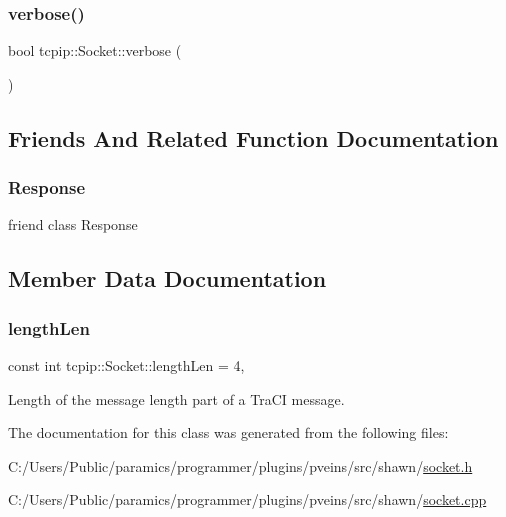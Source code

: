 \subsubsection{\texorpdfstring{verbose()}{verbose()}}
{\footnotesize\ttfamily bool tcpip\+::\+Socket\+::verbose (\begin{DoxyParamCaption}{ }\end{DoxyParamCaption})\hspace{0.3cm}{\ttfamily [inline]}}



\subsection{Friends And Related Function Documentation}
\mbox{\label{classtcpip_1_1_socket_a0bb0e5a2fcd99881ef189293e209db7f}} 
\subsubsection{\texorpdfstring{Response}{Response}}
{\footnotesize\ttfamily friend class Response\hspace{0.3cm}{\ttfamily [friend]}}



\subsection{Member Data Documentation}
\mbox{\label{classtcpip_1_1_socket_a93399f14ffe9894df68fec63a05b4203}} 
\subsubsection{\texorpdfstring{length\+Len}{lengthLen}}
{\footnotesize\ttfamily const int tcpip\+::\+Socket\+::length\+Len = 4\hspace{0.3cm}{\ttfamily [static]}, {\ttfamily [protected]}}



Length of the message length part of a Tra\+CI message. 



The documentation for this class was generated from the following files\+:\begin{DoxyCompactItemize}
\item 
C\+:/\+Users/\+Public/paramics/programmer/plugins/pveins/src/shawn/\hyperlink{socket_8h}{socket.\+h}\item 
C\+:/\+Users/\+Public/paramics/programmer/plugins/pveins/src/shawn/\hyperlink{socket_8cpp}{socket.\+cpp}\end{DoxyCompactItemize}
